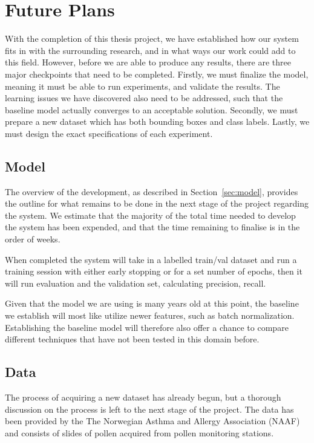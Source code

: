 \chapter{Future Plans}\label{cha:plans}

With the completion of this thesis project, we have established how our system fits in with the surrounding research, and in what ways our work could add to this field.
However, before we are able to produce any results, there are three major checkpoints that need to be completed.
Firstly, we must finalize the model, meaning it must be able to run experiments, and validate the results.
The learning issues we have discovered also need to be addressed, such that the baseline model actually converges to an acceptable solution.
Secondly, we must prepare a new dataset which has both bounding boxes and class labels.
Lastly, we must design the exact specifications of each experiment.


\section{Model}
The overview of the development, as described in Section~\ref{sec:model}, provides the outline for what remains to be done in the next stage of the project regarding the system.
We estimate that the majority of the total time needed to develop the system has been expended, and that the time remaining to finalise is in the order of weeks.

When completed the system will take in a labelled train/val dataset and run a training session with either early stopping or for a set number of epochs, then it will run evaluation and the validation set, calculating precision, recall.

Given that the model we are using is many years old at this point, the baseline we establish will most like utilize newer features, such as batch normalization.
Establishing the baseline model will therefore also offer a chance to compare different techniques that have not been tested in this domain before.

\section{Data}
The process of acquiring a new dataset has already begun, but a thorough discussion on the process is left to the next stage of the project.
The data has been provided by the The Norwegian Asthma and Allergy Association (NAAF) and consists of slides of pollen acquired from pollen monitoring stations. 


